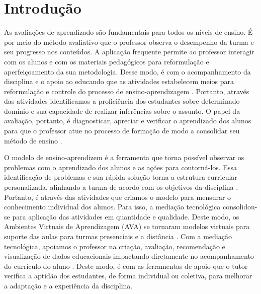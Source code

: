 \chapter{Introdução}
\label{cap1-intro}

As avaliações de aprendizado são fundamentais para todos os níveis de ensino. É por meio do método avaliativo que o professor observa o desempenho da turma e seu progresso nos conteúdos. A aplicação frequente permite ao professor interagir com os alunos e com os materiais pedagógicos para reformulação e aperfeiçoamento da sua metodologia. Desse modo, é com o acompanhamento da disciplina e o apoio ao educando que as atividades estabelecem meios para reformulação e controle do processo de ensino-aprendizagem \cite{barreira2006}. Portanto, através das atividades identificamos a proficiência dos estudantes sobre determinado domínio e sua capacidade de realizar inferências sobre o assunto. O papel da avaliação, portanto, é diagnosticar, apreciar e verificar o aprendizado dos alunos para que o professor atue no processo de formação de modo a consolidar seu método de ensino \cite{oliveira2005}.


O modelo de ensino-aprendizem é a ferramenta que torna possível observar os problemas com o aprendizado dos alunos e as ações para contorná-los. Essa identificação de problemas e sua rápida solução torna a estrutura curricular personalizada, alinhando a turma de acordo com os objetivos da disciplina \cite{biggs1998}. Portanto, é através das atividades que criamos o modelo para mensurar o conhecimento individual dos alunos. Para isso, a mediação tecnológica consolidou-se para aplicação das atividades em quantidade e qualidade. Deste modo, os Ambientes Virtuais de Aprendizagem (AVA) \cite{maquine2020} se tornaram modelos virtuais para suporte das aulas para turmas presenciais e a distância \cite{raes2020}. Com a mediação tecnológica, apoiamos o professor na criação, avaliação, recomendação e visualização de dados educacionais impactando diretamente no acompanhamento do currículo do aluno \cite{paiva2012}. Deste modo, é com as ferramentas de apoio que o tutor verifica a aptidão dos estudantes, de forma individual ou coletiva, para melhorar a adaptação e a experiência da disciplina.

